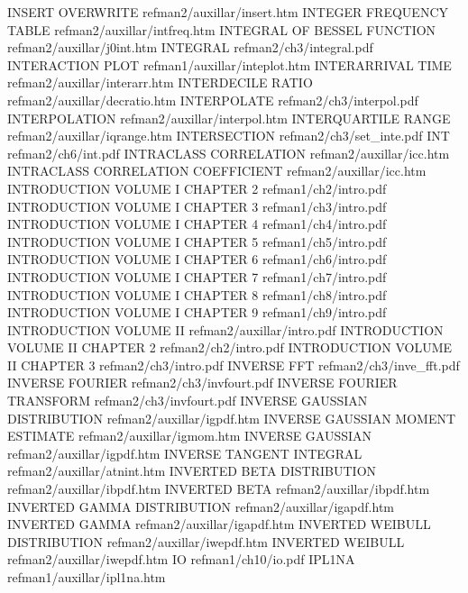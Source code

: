 INSERT OVERWRITE                        refman2/auxillar/insert.htm
INTEGER FREQUENCY TABLE                 refman2/auxillar/intfreq.htm
INTEGRAL OF BESSEL FUNCTION             refman2/auxillar/j0int.htm
INTEGRAL                                refman2/ch3/integral.pdf
INTERACTION PLOT                        refman1/auxillar/inteplot.htm
INTERARRIVAL TIME                       refman2/auxillar/interarr.htm
INTERDECILE RATIO                       refman2/auxillar/decratio.htm
INTERPOLATE                             refman2/ch3/interpol.pdf
INTERPOLATION                           refman2/auxillar/interpol.htm
INTERQUARTILE RANGE                     refman2/auxillar/iqrange.htm
INTERSECTION                            refman2/ch3/set_inte.pdf
INT                                     refman2/ch6/int.pdf
INTRACLASS CORRELATION                  refman2/auxillar/icc.htm
INTRACLASS CORRELATION COEFFICIENT      refman2/auxillar/icc.htm
INTRODUCTION VOLUME I CHAPTER 2         refman1/ch2/intro.pdf
INTRODUCTION VOLUME I CHAPTER 3         refman1/ch3/intro.pdf
INTRODUCTION VOLUME I CHAPTER 4         refman1/ch4/intro.pdf
INTRODUCTION VOLUME I CHAPTER 5         refman1/ch5/intro.pdf
INTRODUCTION VOLUME I CHAPTER 6         refman1/ch6/intro.pdf
INTRODUCTION VOLUME I CHAPTER 7         refman1/ch7/intro.pdf
INTRODUCTION VOLUME I CHAPTER 8         refman1/ch8/intro.pdf
INTRODUCTION VOLUME I CHAPTER 9         refman1/ch9/intro.pdf
INTRODUCTION VOLUME II                  refman2/auxillar/intro.pdf
INTRODUCTION VOLUME II CHAPTER 2        refman2/ch2/intro.pdf
INTRODUCTION VOLUME II CHAPTER 3        refman2/ch3/intro.pdf
INVERSE FFT                             refman2/ch3/inve_fft.pdf
INVERSE FOURIER                         refman2/ch3/invfourt.pdf
INVERSE FOURIER TRANSFORM               refman2/ch3/invfourt.pdf
INVERSE GAUSSIAN DISTRIBUTION           refman2/auxillar/igpdf.htm
INVERSE GAUSSIAN MOMENT ESTIMATE        refman2/auxillar/igmom.htm
INVERSE GAUSSIAN                        refman2/auxillar/igpdf.htm
INVERSE TANGENT INTEGRAL                refman2/auxillar/atnint.htm
INVERTED BETA DISTRIBUTION              refman2/auxillar/ibpdf.htm
INVERTED BETA                           refman2/auxillar/ibpdf.htm
INVERTED GAMMA DISTRIBUTION             refman2/auxillar/igapdf.htm
INVERTED GAMMA                          refman2/auxillar/igapdf.htm
INVERTED WEIBULL DISTRIBUTION           refman2/auxillar/iwepdf.htm
INVERTED WEIBULL                        refman2/auxillar/iwepdf.htm
IO                                      refman1/ch10/io.pdf
IPL1NA                                  refman1/auxillar/ipl1na.htm
